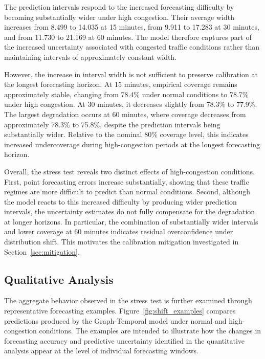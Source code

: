 The prediction intervals respond to the increased forecasting difficulty by
becoming substantially wider under high congestion. Their average width
increases from 8.499 to 14.035 at 15 minutes, from 9.911 to 17.283 at
30 minutes, and from 11.730 to 21.169 at 60 minutes. The model therefore
captures part of the increased uncertainty associated with congested traffic
conditions rather than maintaining intervals of approximately constant width.

However, the increase in interval width is not sufficient to preserve
calibration at the longest forecasting horizon. At 15 minutes, empirical
coverage remains approximately stable, changing from 78.4\% under normal
conditions to 78.7\% under high congestion. At 30 minutes, it decreases
slightly from 78.3\% to 77.9\%. The largest degradation occurs at 60 minutes,
where coverage decreases from approximately 78.3\% to 75.8\%, despite the
prediction intervals being substantially wider. Relative to the nominal
80\% coverage level, this indicates increased undercoverage during
high-congestion periods at the longest forecasting horizon.

Overall, the stress test reveals two distinct effects of high-congestion
conditions. First, point forecasting errors increase substantially, showing
that these traffic regimes are more difficult to predict than normal
conditions. Second, although the model reacts to this increased difficulty
by producing wider prediction intervals, the uncertainty estimates do not
fully compensate for the degradation at longer horizons. In particular, the
combination of substantially wider intervals and lower coverage at 60 minutes
indicates residual overconfidence under distribution shift. This motivates
the calibration mitigation investigated in Section~\ref{sec:mitigation}.

\subsection{Qualitative Analysis}
\label{subsec:shift_qualitative}

The aggregate behavior observed in the stress test is further examined
through representative forecasting examples. Figure~\ref{fig:shift_examples}
compares predictions produced by the Graph-Temporal model under normal and
high-congestion conditions. The examples are intended to illustrate how the
changes in forecasting accuracy and predictive uncertainty identified in the
quantitative analysis appear at the level of individual forecasting windows.

